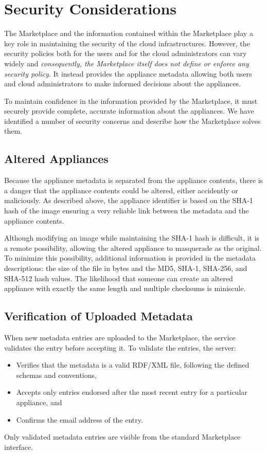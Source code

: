 \section{Security Considerations}
\label{sec:security}

The Marketplace and the information contained within the Marketplace
play a key role in maintaining the security of the cloud
infrastructures.  However, the security policies both for the users
and for the cloud administrators can vary widely and {\em
  consequently, the Marketplace itself does not define or enforce any
  security policy.}  It instead provides the appliance metadata
allowing both users and cloud administrators to make informed
decisions about the appliances.

To maintain confidence in the information provided by the Marketplace,
it must securely provide complete, accurate information about the
appliances.  We have identified a number of security concerns and
describe how the Marketplace solves them. 

\subsection{Altered Appliances}

Because the appliance metadata is separated from the appliance
contents, there is a danger that the appliance contents could be
altered, either accidently or maliciously.  As described above,
the appliance identifier is based on the SHA-1 hash of the image
ensuring a very reliable link between the metadata and the
appliance contents.

Although modifying an image while maintaining the SHA-1 hash is
difficult, it is a remote possibility, allowing the altered appliance
to masquerade as the original.  To minimize this possibility,
additional information is provided in the metadata descriptions: the
size of the file in bytes and the MD5, SHA-1, SHA-256, and SHA-512
hash values.  The likelihood that someone can create an altered
appliance with exactly the same length and multiple checksums is
miniscule.

\subsection{Verification of Uploaded Metadata}

When new metadata entries are uploaded to the Marketplace, the service
validates the entry before accepting it.  To validate the entries, the server:
\begin{itemize}
\item Verifies that the metadata is a valid RDF/XML file, following
  the defined schemas and conventions,
\item Accepts only entries endorsed after the most recent entry for a
  particular appliance, and 
\item Confirms the email address of the entry.
\end{itemize}
Only validated metadata entries are visible from the standard
Marketplace interface.

